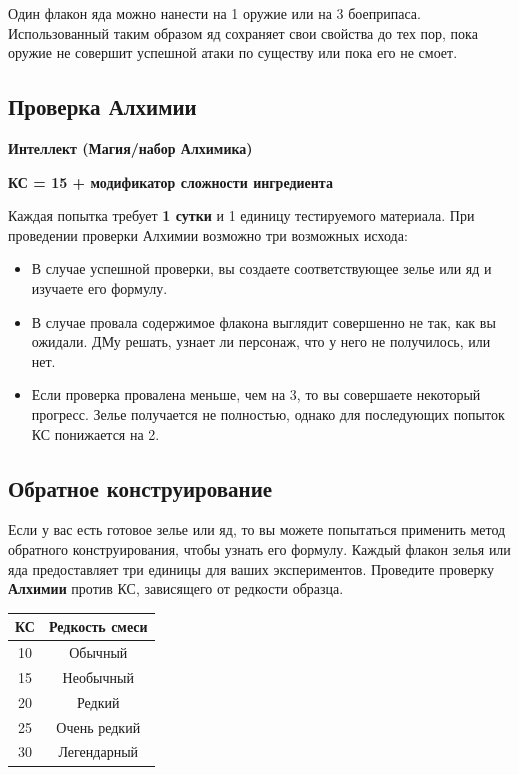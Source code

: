 \documentclass[a4paper, 9pt, twocolumn]{book}
\begin{document}
	Один флакон яда можно нанести на 1 оружие или на 3 боеприпаса. Использованный таким образом яд сохраняет свои свойства до тех пор, пока оружие не совершит успешной атаки по существу или пока его не смоет.
	
	\subsection{Проверка Алхимии}
	
	\textbf{Интеллект (Магия/набор Алхимика)}
	
	\textbf{КС = 15 + модификатор сложности ингредиента}
	
	Каждая попытка требует \textbf{1 сутки} и 1 единицу тестируемого материала. При проведении проверки Алхимии возможно три возможных исхода:
	
	\begin{itemize}
		\item В случае успешной проверки, вы создаете соответствующее зелье или яд и изучаете его формулу.
		
		\item В случае провала содержимое флакона выглядит совершенно не так, как вы ожидали. ДМу решать, узнает ли персонаж, что у него не получилось, или нет.
		
		\item Если проверка провалена меньше, чем на 3, то вы совершаете некоторый прогресс. Зелье получается не полностью, однако для последующих попыток КС понижается на 2.
	\end{itemize}

	\subsection{Обратное конструирование}
	
	Если у вас есть готовое зелье или яд, то вы можете попытаться применить метод обратного конструирования, чтобы узнать его формулу. Каждый флакон зелья или яда предоставляет три единицы для ваших экспериментов. Проведите проверку \textbf{Алхимии} против КС, зависящего от редкости образца.
	
	\begin{tabular}{|c|c|}
		\hline
		\textbf{КС} & \textbf{Редкость смеси} \\
		\hline
		10 & Обычный \\
		\hline
		15 & Необычный \\
		\hline
		20 & Редкий \\
		\hline
		25 & Очень редкий \\
		\hline
		30 & Легендарный \\
		\hline
	\end{tabular}
	
\end{document}
